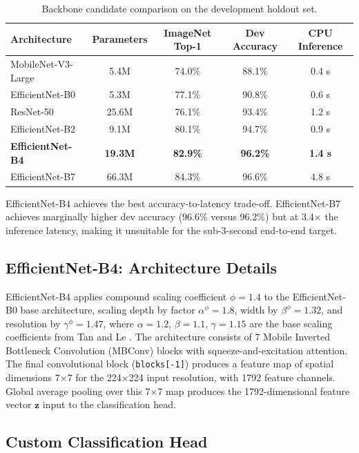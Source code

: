 \documentclass[12pt,a4paper,oneside]{report}
\begin{document}
\begin{table}[H]
\centering
\caption{Backbone candidate comparison on the development holdout set.}
\label{tab:backbone_comp}
\renewcommand{\arraystretch}{1.3}
\begin{tabular}{lcccc}
\toprule
\textbf{Architecture} & \textbf{Parameters} & \textbf{ImageNet Top-1} & \textbf{Dev Accuracy} & \textbf{CPU Inference} \\
\midrule
MobileNet-V3-Large  & 5.4M  & 74.0\% & 88.1\% & 0.4 s \\
EfficientNet-B0     & 5.3M  & 77.1\% & 90.8\% & 0.6 s \\
ResNet-50           & 25.6M & 76.1\% & 93.4\% & 1.2 s \\
EfficientNet-B2     & 9.1M  & 80.1\% & 94.7\% & 0.9 s \\
\textbf{EfficientNet-B4} & \textbf{19.3M} & \textbf{82.9\%} & \textbf{96.2\%} & \textbf{1.4 s} \\
EfficientNet-B7     & 66.3M & 84.3\% & 96.6\% & 4.8 s \\
\bottomrule
\end{tabular}
\end{table}

EfficientNet-B4 achieves the best accuracy-to-latency trade-off. EfficientNet-B7
achieves marginally higher dev accuracy (96.6\% versus 96.2\%) but at 3.4$\times$
the inference latency, making it unsuitable for the sub-3-second end-to-end target.

\subsection{EfficientNet-B4: Architecture Details}

EfficientNet-B4 applies compound scaling coefficient $\phi=1.4$ to the
EfficientNet-B0 base architecture, scaling depth by factor $\alpha^\phi=1.8$,
width by $\beta^\phi=1.32$, and resolution by $\gamma^\phi=1.47$, where
$\alpha=1.2$, $\beta=1.1$, $\gamma=1.15$ are the base scaling coefficients
from Tan and Le \cite{tan2019efficientnet}. The architecture consists of 7
Mobile Inverted Bottleneck Convolution (MBConv) blocks with squeeze-and-excitation
attention. The final convolutional block (\texttt{blocks[-1]}) produces a feature
map of spatial dimensions 7$\times$7 for the 224$\times$224 input resolution,
with 1792 feature channels. Global average pooling over this 7$\times$7 map
produces the 1792-dimensional feature vector $\mathbf{z}$ input to the
classification head.

\subsection{Custom Classification Head}
\end{document}
